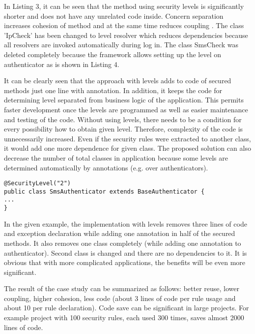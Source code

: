 \documentclass{sig-alternate-05-2015}
\begin{document}
In Listing 3, it can be seen that the method using security levels is significantly shorter and does not have any unrelated code inside. Concern separation \cite{concernSeparation} increases cohesion \cite{cohesionCoupling} of method and at the same time reduces coupling \cite{cohesionCoupling}. The class 'IpCheck' has been changed to level resolver which reduces dependencies because all resolvers are invoked automatically during log in. The class SmsCheck was deleted completely because the framework allows setting up the level on authenticator as is shown in Listing 4.

It can be clearly seen that the approach with levels adds to code of secured methods just one line with annotation. In addition, it keeps the code for determining level separated from business logic of the application. This permits faster development once the levels are programmed as well as easier maintenance and testing of the code. Without using levels, there needs to be a condition for every possibility how to obtain given level. Therefore, complexity of the code is unnecessarily increased. Even if the security rules were extracted to another class, it would add one more dependence for given class. The proposed solution can also decrease the number of total classes in application because some levels are determined automatically by annotations (e.g. over authenticators).

\begin{lstlisting}[]
@SecurityLevel("2")
public class SmsAuthenticator extends BaseAuthenticator {
...
}
\end{lstlisting}

In the given example, the implementation with levels removes three lines of code and exception declaration while adding one annotation in half of the secured methods. It also removes one class completely (while adding one annotation to authenticator). Second class is changed and there are no dependencies to it. It is obvious that with more complicated applications, the benefits will be even more significant.

The result of the case study can be summarized as follows: better reuse, lower coupling, higher cohesion, less code (about 3 lines of code per rule usage and about 10 per rule declaration). Code save can be significant in large projects. For example project with 100 security rules, each used 300 times, saves almost 2000 lines of code.
\end{document}
